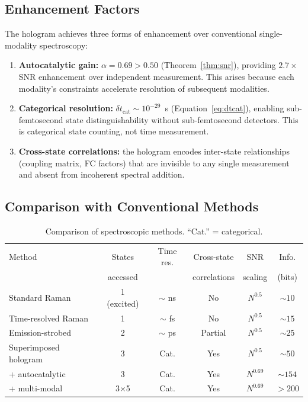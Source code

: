 \documentclass[11pt,a4paper]{article}
\theoremstyle{definition}
\theoremstyle{remark}
\begin{document}
\subsection{Enhancement Factors}

The hologram achieves three forms of enhancement over conventional single-modality spectroscopy:

\begin{enumerate}[label=(\roman*)]
  \item \textbf{Autocatalytic gain:} $\alpha = 0.69 > 0.50$ (Theorem~\ref{thm:snr}), providing $2.7\times$ SNR enhancement over independent measurement. This arises because each modality's constraints accelerate resolution of subsequent modalities.
  \item \textbf{Categorical resolution:} $\delta t_{\mathrm{cat}} \sim 10^{-29}$~s (Equation~\ref{eq:dtcat}), enabling sub-femtosecond state distinguishability without sub-femtosecond detectors. This is categorical state counting, not time measurement.
  \item \textbf{Cross-state correlations:} the hologram encodes inter-state relationships (coupling matrix, FC factors) that are invisible to any single measurement and absent from incoherent spectral addition.
\end{enumerate}

\subsection{Comparison with Conventional Methods}

\begin{table}[ht]
\centering
\caption{Comparison of spectroscopic methods. ``Cat.'' = categorical.}
\label{tab:comparison}
\begin{tabular}{lccccc}
\toprule
Method & States & Time res. & Cross-state & SNR & Info. \\
 & accessed & & correlations & scaling & (bits) \\
\midrule
Standard Raman & 1 (excited) & $\sim$ ns & No & $N^{0.5}$ & $\sim 10$ \\
Time-resolved Raman & 1 & $\sim$ fs & No & $N^{0.5}$ & $\sim 15$ \\
Emission-strobed & 2 & $\sim$ ps & Partial & $N^{0.5}$ & $\sim 25$ \\
Superimposed hologram & 3 & Cat. & Yes & $N^{0.5}$ & $\sim 50$ \\
+ autocatalytic & 3 & Cat. & Yes & $N^{0.69}$ & $\sim 154$ \\
+ multi-modal & 3$\times$5 & Cat. & Yes & $N^{0.69}$ & $> 200$ \\
\bottomrule
\end{tabular}
\end{table}
\end{document}
